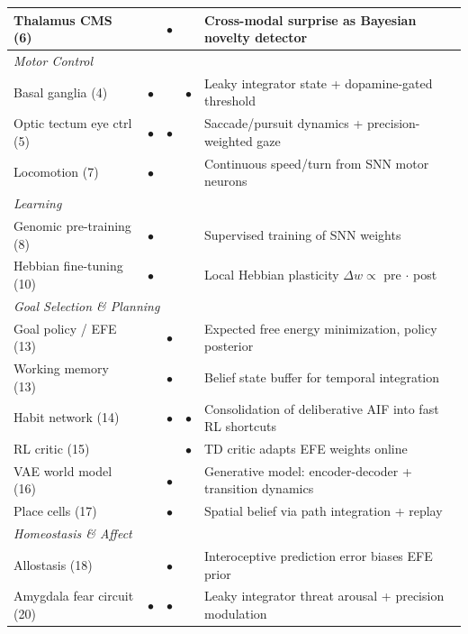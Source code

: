 \documentclass[11pt,a4paper]{article}
\begin{document}
\begin{table}[H]
\begin{tabular}{lcccp{5.8cm}}
Thalamus CMS (6)               &           & $\bullet$ &           & Cross-modal surprise as Bayesian novelty detector \\
\midrule
\multicolumn{5}{l}{\textit{Motor Control}} \\
Basal ganglia (4)              & $\bullet$ &           & $\bullet$ & Leaky integrator state + dopamine-gated threshold \\
Optic tectum eye ctrl (5)      & $\bullet$ & $\bullet$ &           & Saccade/pursuit dynamics + precision-weighted gaze \\
Locomotion (7)                 & $\bullet$ &           &           & Continuous speed/turn from SNN motor neurons \\
\midrule
\multicolumn{5}{l}{\textit{Learning}} \\
Genomic pre-training (8)       & $\bullet$ &           &           & Supervised training of SNN weights \\
Hebbian fine-tuning (10)       & $\bullet$ &           &           & Local Hebbian plasticity $\Delta w \propto$ pre $\cdot$ post \\
\midrule
\multicolumn{5}{l}{\textit{Goal Selection \& Planning}} \\
Goal policy / EFE (13)         &           & $\bullet$ &           & Expected free energy minimization, policy posterior \\
Working memory (13)            &           & $\bullet$ &           & Belief state buffer for temporal integration \\
Habit network (14)             &           & $\bullet$ & $\bullet$ & Consolidation of deliberative AIF into fast RL shortcuts \\
RL critic (15)                 &           &           & $\bullet$ & TD critic adapts EFE weights online \\
VAE world model (16)           &           & $\bullet$ &           & Generative model: encoder-decoder + transition dynamics \\
Place cells (17)               &           & $\bullet$ &           & Spatial belief via path integration + replay \\
\midrule
\multicolumn{5}{l}{\textit{Homeostasis \& Affect}} \\
Allostasis (18)                &           & $\bullet$ &           & Interoceptive prediction error biases EFE prior \\
Amygdala fear circuit (20)     & $\bullet$ & $\bullet$ &           & Leaky integrator threat arousal + precision modulation \\

\end{tabular}
\end{table}
\end{document}
